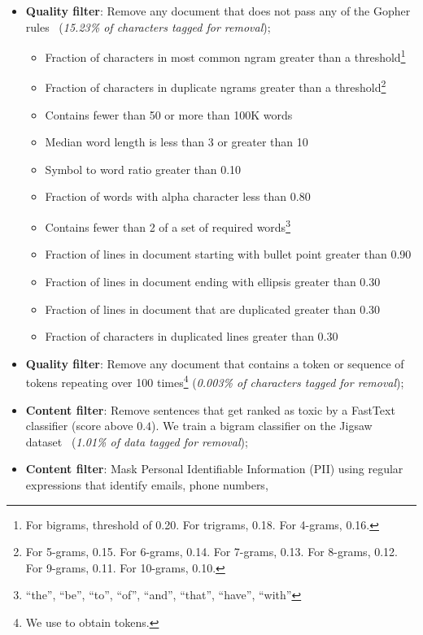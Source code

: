 \begin{itemize}[leftmargin=1em]
    \item \textbf{Quality filter}: Remove any document that does not pass any of the Gopher rules~\citep{Rae2021ScalingLM} (\textit{15.23\% of characters tagged for removal}); 
    \begin{itemize}
        \item Fraction of characters in most common ngram greater than a threshold\footnote{For bigrams, threshold of 0.20. For trigrams, 0.18. For 4-grams, 0.16.}
        \item Fraction of characters in duplicate ngrams greater than a threshold\footnote{For 5-grams, 0.15. For 6-grams, 0.14. For 7-grams, 0.13. For 8-grams, 0.12. For 9-grams, 0.11. For 10-grams, 0.10.}
        \item Contains fewer than 50 or more than 100K words
        \item Median word length is less than 3 or greater than 10
        \item Symbol to word ratio greater than 0.10
        \item Fraction of words with alpha character less than 0.80
        \item Contains fewer than 2 of a set of required words\footnote{``the'', ``be'', ``to'', ``of'', ``and'', ``that'', ``have'', ``with''}
        \item Fraction of lines in document starting with bullet point greater than 0.90
        \item Fraction of lines in document ending with ellipsis greater than 0.30
        \item Fraction of lines in document that are duplicated greater than 0.30
        \item Fraction of characters in duplicated lines greater than 0.30
    \end{itemize}
    \item \textbf{Quality filter}: Remove any document that contains a token or sequence of tokens repeating over 100 times\footnote{\label{foot:reps}We use \href{https://huggingface.co/allenai/gpt-neox-olmo-dolma-v1_5}{} to obtain tokens.}
    (\textit{0.003\% of characters tagged for removal}); 
    \item \textbf{Content filter}: Remove sentences that get ranked as toxic by a FastText classifier (score above $0.4$). We train a bigram classifier on the Jigsaw dataset~\citep{jigsaw} (\textit{1.01\% of data tagged for removal});
    \item  \textbf{Content filter}: Mask Personal Identifiable Information (PII) using regular expressions that identify emails, phone numbers, 

\end{itemize}
